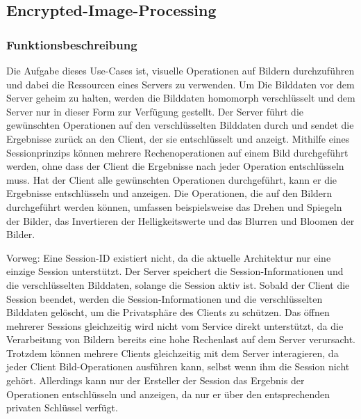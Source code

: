 \subsection{Encrypted-Image-Processing}
\label{sub:encrypted_image_processing}

\subsubsection{Funktionsbeschreibung}
Die Aufgabe dieses Use-Cases ist, visuelle Operationen auf Bildern durchzuführen und dabei die Ressourcen eines Servers zu verwenden. Um Die Bilddaten vor dem Server geheim zu halten, werden die Bilddaten homomorph verschlüsselt und dem Server nur in dieser Form zur Verfügung gestellt. Der Server führt die gewünschten Operationen auf den verschlüsselten Bilddaten durch und sendet die Ergebnisse zurück an den Client, der sie entschlüsselt und anzeigt. Mithilfe eines Sessionprinzips können mehrere Rechenoperationen auf einem Bild durchgeführt werden, ohne dass der Client die Ergebnisse nach jeder Operation entschlüsseln muss. Hat der Client alle gewünschten Operationen durchgeführt, kann er die Ergebnisse entschlüsseln und anzeigen. Die Operationen, die auf den Bildern durchgeführt werden können, umfassen beispielsweise das Drehen und Spiegeln der Bilder, das Invertieren der Helligkeitswerte und das Blurren und Bloomen der Bilder.

Vorweg: Eine Session-ID existiert nicht, da die aktuelle Architektur nur eine einzige Session unterstützt. Der Server speichert die Session-Informationen und die verschlüsselten Bilddaten, solange die Session aktiv ist. Sobald der Client die Session beendet, werden die Session-Informationen und die verschlüsselten Bilddaten gelöscht, um die Privatsphäre des Clients zu schützen. Das öffnen mehrerer Sessions gleichzeitig wird nicht vom Service direkt unterstützt, da die Verarbeitung von Bildern bereits eine hohe Rechenlast auf dem Server verursacht. Trotzdem können mehrere Clients gleichzeitig mit dem Server interagieren, da jeder Client Bild-Operationen ausführen kann, selbst wenn ihm die Session nicht gehört. Allerdings kann nur der Ersteller der Session das Ergebnis der Operationen entschlüsseln und anzeigen, da nur er über den entsprechenden privaten Schlüssel verfügt.

